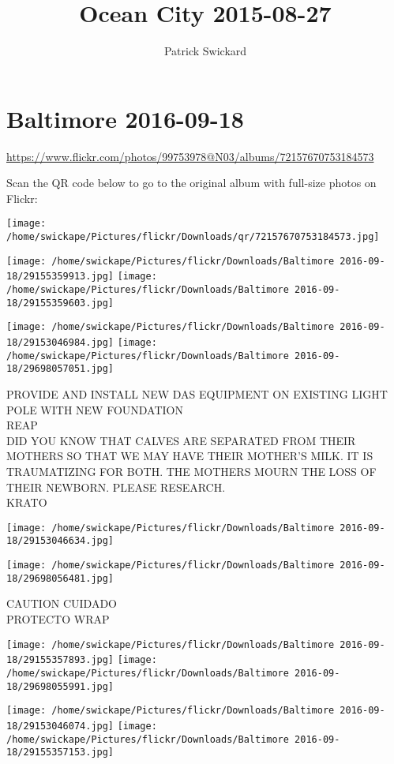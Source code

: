 \documentclass[10pt,letterpaper]{article}
\title{Ocean City 2015-08-27}
\author{Patrick Swickard}
\date{}
\begin{document}
\section*{Baltimore 2016-09-18}

\url{https://www.flickr.com/photos/99753978@N03/albums/72157670753184573}

Scan the QR code below to go to the original album with full-size photos on Flickr:

\texttt{[image: /home/swickape/Pictures/flickr/Downloads/qr/72157670753184573.jpg]}
\pagebreak

\texttt{[image: /home/swickape/Pictures/flickr/Downloads/Baltimore 2016-09-18/29155359913.jpg]}
\texttt{[image: /home/swickape/Pictures/flickr/Downloads/Baltimore 2016-09-18/29155359603.jpg]}

\texttt{[image: /home/swickape/Pictures/flickr/Downloads/Baltimore 2016-09-18/29153046984.jpg]}
\texttt{[image: /home/swickape/Pictures/flickr/Downloads/Baltimore 2016-09-18/29698057051.jpg]}

PROVIDE AND INSTALL NEW DAS EQUIPMENT ON EXISTING LIGHT POLE WITH NEW FOUNDATION\\
REAP\\
DID YOU KNOW THAT CALVES ARE SEPARATED FROM THEIR MOTHERS SO THAT WE MAY HAVE THEIR MOTHER'S MILK.  IT IS TRAUMATIZING FOR BOTH.  THE MOTHERS MOURN THE LOSS OF THEIR NEWBORN.  PLEASE RESEARCH.\\
KRATO
\pagebreak

\texttt{[image: /home/swickape/Pictures/flickr/Downloads/Baltimore 2016-09-18/29153046634.jpg]}

\vspace{0.25in}
\texttt{[image: /home/swickape/Pictures/flickr/Downloads/Baltimore 2016-09-18/29698056481.jpg]}

CAUTION CUIDADO\\
PROTECTO WRAP
\pagebreak

\texttt{[image: /home/swickape/Pictures/flickr/Downloads/Baltimore 2016-09-18/29155357893.jpg]}
\texttt{[image: /home/swickape/Pictures/flickr/Downloads/Baltimore 2016-09-18/29698055991.jpg]}

\texttt{[image: /home/swickape/Pictures/flickr/Downloads/Baltimore 2016-09-18/29153046074.jpg]}
\texttt{[image: /home/swickape/Pictures/flickr/Downloads/Baltimore 2016-09-18/29155357153.jpg]}
\end{document}
